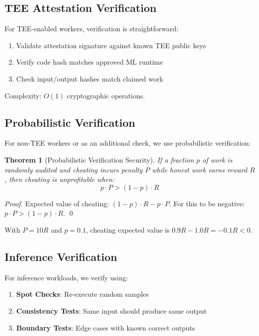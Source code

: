 \documentclass[11pt,letterpaper]{article}
\newtheorem{theorem}{Theorem}[section]
\begin{document}
\subsection{TEE Attestation Verification}

For TEE-enabled workers, verification is straightforward:

\begin{enumerate}
    \item Validate attestation signature against known TEE public keys
    \item Verify code hash matches approved ML runtime
    \item Check input/output hashes match claimed work
\end{enumerate}

Complexity: $O(1)$ cryptographic operations.

\subsection{Probabilistic Verification}

For non-TEE workers or as an additional check, we use probabilistic verification:

\begin{theorem}[Probabilistic Verification Security]
If a fraction $p$ of work is randomly audited and cheating incurs penalty $P$ while honest work earns reward $R$, then cheating is unprofitable when:
\begin{equation}
p \cdot P > (1-p) \cdot R
\end{equation}
\end{theorem}

\begin{proof}
Expected value of cheating: $(1-p) \cdot R - p \cdot P$. For this to be negative: $p \cdot P > (1-p) \cdot R$. \qed
\end{proof}

With $P = 10R$ and $p = 0.1$, cheating expected value is $0.9R - 1.0R = -0.1R < 0$.

\subsection{Inference Verification}

For inference workloads, we verify using:

\begin{enumerate}
    \item \textbf{Spot Checks}: Re-execute random samples
    \item \textbf{Consistency Tests}: Same input should produce same output
    \item \textbf{Boundary Tests}: Edge cases with known correct outputs
\end{enumerate}
\end{document}
